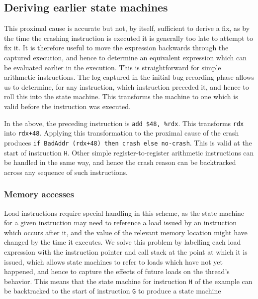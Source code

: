 \documentclass[10pt,twocolumn,preprint,natbib,authoryear]{sigplanconf}
\newcommand{\editorial}[1]{}
\begin{document}
\subsection{Deriving earlier state machines}
This proximal cause is accurate but not, by itself, sufficient to
derive a fix, as by the time the crashing instruction is executed it
is generally too late to attempt to fix it.  It is therefore useful to
move the expression backwards through the captured execution, and
hence to determine an equivalent expression which can be evaluated
earlier in the execution.  This is straightforward for simple
arithmetic instructions.  The log captured in the initial
bug-recording phase allows us to determine, for any instruction, which
instruction preceded it, and hence to roll this into the 
state machine.  This transforms the machine to one
which is valid before the instruction was executed.

In the above, the preceding instruction is \verb|add $48, %rdx|.  This
transforms \verb|rdx| into \verb|rdx+48|.  Applying this
transformation to the proximal cause of the crash produces
\verb|if BadAddr (rdx+48) then crash else no-crash|.  This is valid at
the start of instruction \verb|H|.  Other simple register-to-register
arithmetic instructions can be handled in the same way, and hence the
crash reason can be backtracked across any sequence of such
instructions.

\editorial{Our implementation uses libVEX to decode x86 instructions
  into a sequence of micro-operations which can be used as input to
  this process.} 

\subsubsection{Memory accesses}

Load instructions require special handling in this scheme, as the
state machine for a given instruction may need to reference a load
issued by an instruction which occurs after it, and the value of the
relevant memory location might have changed by the time it executes.
We solve this problem by labelling each load expression with the
instruction pointer and call stack at the point at which it is issued,
which allows state machines to refer to loads which have not yet
happened, and hence to capture the effects of future loads on the
thread's behavior.  This means that the state machine for instruction
\verb|H| of the example can be backtracked to the start of instruction
\verb|G| to produce a state machine
\end{document}

